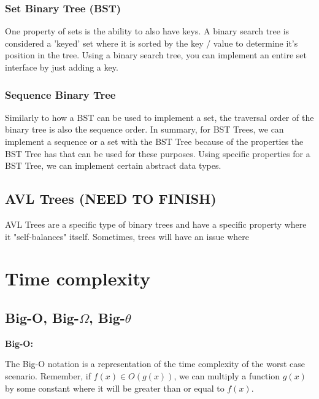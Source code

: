 \documentclass[11pt,a4paper,english]{report}
\begin{document}
\bigskip
\subsection{Set Binary Tree (BST)} 

One property of sets is the ability to also have keys. A binary search tree is considered a 'keyed' set where it is sorted by the key / value to determine it's position in the tree. Using a binary search tree, you can implement an entire set interface by just adding a key.

\subsection{Sequence Binary Tree}

Similarly to how a BST can be used to implement a set, the traversal order of the binary tree is also the sequence order. In summary, for BST Trees, we can implement a sequence or a set with the BST Tree because of the properties the BST Tree has that can be used for these purposes. Using specific properties for a BST Tree, we can implement certain abstract data types. 



\section{AVL Trees (NEED TO FINISH)}

AVL Trees are a specific type of binary trees and have a specific property where it "self-balances" itself. Sometimes, trees will have an issue where 













\chapter{Time complexity}
\section{Big-O, Big-$\Omega$, Big-$\theta$}

\textbf{Big-O:}

\noindent The Big-O notation is a representation of the time complexity of the worst case scenario.  Remember, if $f(x) \in O(g(x))$, we can multiply a function $g(x)$ by some constant where it will be greater than or equal to $f(x)$. 
\end{document}
